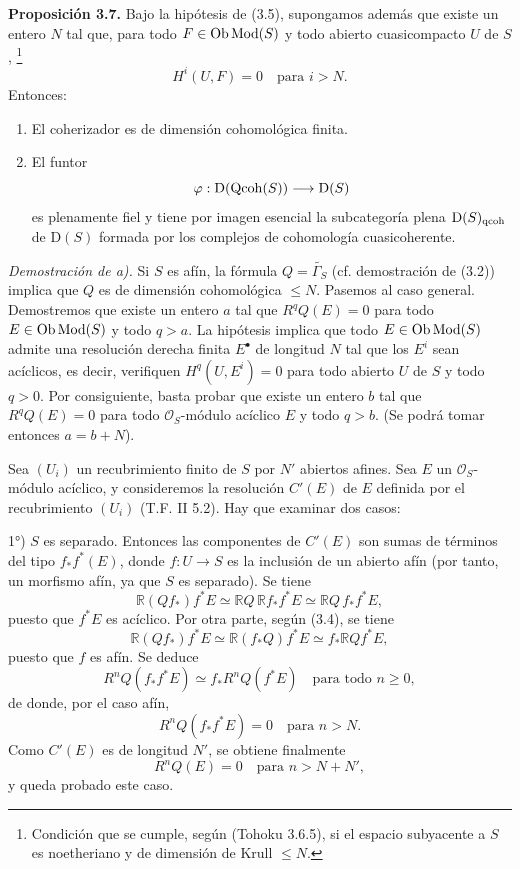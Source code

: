 \providecommand{\sisi}[2]{#2}

\textbf{Proposición 3.7.} Bajo la hipótesis de (3.5), supongamos además que existe un entero $N$ tal que, para todo $F\in\operatorname{Ob}\operatorname{Mod}(S)$ y todo abierto cuasicompacto $U$ de $S$,
\footnote{Condición que se cumple, según (Tohoku 3.6.5), si el espacio subyacente a $S$ es noetheriano y de dimensión de Krull $\leq N$.}
\[
 H^i(U,F)=0\quad\text{para }i>N.
\]
Entonces:
\begin{enumerate}[label=\alph*)]
\item El coherizador es de dimensión cohomológica finita.
\item El funtor
\[
 \varphi:\mathrm D(\operatorname{Qcoh}(S))\longrightarrow \mathrm D(S)
\]
es plenamente fiel y tiene por imagen esencial la subcategoría plena $\mathrm D(S)_{\mathrm{qcoh}}$ de $\mathrm D(S)$ formada por los complejos de cohomología cuasicoherente.
\end{enumerate}

\emph{Demostración de a).} Si $S$ es afín, la fórmula $Q=\widetilde{\Gamma_S}$ (cf. demostración de (3.2)) implica que $Q$ es de dimensión cohomológica $\leq N$. Pasemos al caso general. Demostremos que existe un entero $a$ tal que $R^qQ(E)=0$ para todo $E\in\operatorname{Ob}\operatorname{Mod}(S)$ y todo $q>a$. La hipótesis implica que todo $E\in\operatorname{Ob}\operatorname{Mod}(S)$ admite una resolución derecha finita $E^\bullet$ de longitud $N$ tal que los $E^i$ sean acíclicos, es decir, verifiquen $H^q(U,E^i)=0$ para todo abierto $U$ de $S$ y todo $q>0$. Por consiguiente, basta probar que existe un entero $b$ tal que $R^qQ(E)=0$ para todo $\mathcal O_S$-módulo acíclico $E$ y todo $q>b$. (Se podrá tomar entonces $a=b+N$).

Sea $(U_i)$ un recubrimiento finito de $S$ por $N'$ abiertos afines. Sea $E$ un $\mathcal O_S$-módulo acíclico, y consideremos la resolución $C'(E)$ de $E$ definida por el recubrimiento $(U_i)$ (T.F. II 5.2). Hay que examinar dos casos:

1°) $S$ es separado. Entonces las componentes de $C'(E)$ son sumas de términos del tipo $f_*f^*(E)$, donde $f:U\longrightarrow S$ es la inclusión de un abierto afín (por tanto, un morfismo afín, ya que $S$ es separado). Se tiene
\[
 \mathbb R(Qf_*)f^*E\simeq \mathbb RQ\,\mathbb Rf_*f^*E\simeq \mathbb RQ\,f_*f^*E,
\]
puesto que $f^*E$ es acíclico. Por otra parte, según (3.4), se tiene
\[
 \mathbb R(Qf_*)f^*E\simeq \mathbb R(f_*Q)f^*E\simeq f_*\mathbb RQf^*E,
\]
puesto que $f$ es afín. Se deduce
\[
 R^nQ(f_*f^*E)\simeq f_*R^nQ(f^*E)
 \quad\text{para todo }n\geq0,
\]
de donde, por el caso afín,
\[
 R^nQ(f_*f^*E)=0\quad\text{para }n>N.
\]
Como $C'(E)$ es de longitud $N'$, se obtiene finalmente
\[
 R^nQ(E)=0\quad\text{para }n>N+N',
\]
y queda probado este caso.

